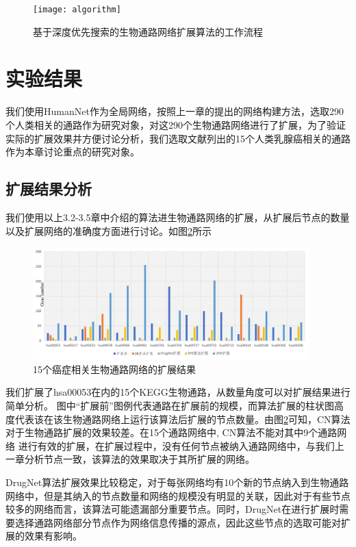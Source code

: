 \begin{figure}[h]
\centering
\texttt{[image: algorithm]}
\caption[algorithm]{基于深度优先搜索的生物通路网络扩展算法的工作流程}
\label{algorithm}
\end{figure}

\newpage

 \section{实验结果}
 我们使用HumanNet作为全局网络，按照上一章的提出的网络构建方法，选取290个人类相关的通路作为研究对象，对这290个生物通路网络进行了扩展，为了验证实际的扩展效果并方便讨论分析，我们选取文献\cite{zhang2016network}列出的15个人类乳腺癌相关的通路作为本章讨论重点的研究对象。
 \subsection{扩展结果分析}
 我们使用以上3.2-3.5章中介绍的算法进生物通路网络的扩展，从扩展后节点的数量以及扩展网络的准确度方面进行讨论。如图\ref{allexpansion}所示
 \begin{figure}[h]
\centering
\includegraphics[width = 0.95\textwidth]{allexpansion}
\caption[allexpansion]{15个癌症相关生物通路网络的扩展结果}
\label{allexpansion}
\end{figure}

我们扩展了hsa00053在内的15个KEGG\cite{kanehisa2008kegg}生物通路，从数量角度可以对扩展结果进行简单分析。
图中“扩展前”图例代表通路在扩展前的规模，而算法扩展的柱状图高度代表该在该生物通路网络上运行该算法后扩展的节点数量。由图\ref{allexpansion}可知，CN算法对于生物通路扩展的效果较差。在15个通路网络中, CN算法不能对其中9个通路网络
进行有效的扩展，在扩展过程中，没有任何节点被纳入通路网络中，与我们上一章分析节点一致，该算法的效果取决于其所扩展的网络。

DrugNet算法扩展效果比较稳定，对于每张网络均有10个新的节点纳入到生物通路网络中，但是其纳入的节点数量和网络的规模没有明显的关联，因此对于有些节点较多的网络而言，该算法可能遗漏部分重要节点。同时，DrugNet在进行扩展时需要选择通路网络部分节点作为网络信息传播的源点，因此这些节点的选取可能对扩展的效果有影响。


